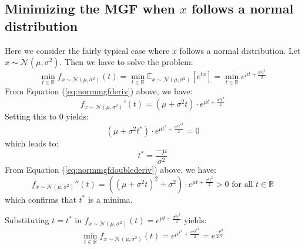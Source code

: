 \documentclass[10pt]{amsart}
\begin{document}
\subsection{Minimizing the MGF when $x$ follows a normal distribution}
Here we consider the fairly typical case where $x$ follows a normal distribution. Let $x\sim \mathcal{N}(\mu, \sigma^2)$. Then we have to solve the problem:
$$\min_{t\in \mathbb{R}} f_{x\sim \mathcal{N}(\mu, \sigma^2)}(t) = \min_{t\in \mathbb{R}} \mathbb{E}_{x\sim \mathcal{N}(\mu, \sigma^2)}[e^{tx}] = \min_{t\in \mathbb{R}} e^{\mu t + \frac {\sigma^2 t^2} 2}$$
From Equation (\ref{eq:normmgfderiv}) above, we have:
$$f_{x\sim \mathcal{N}(\mu, \sigma^2)}'(t) = (\mu + \sigma^2t)\cdot e^{\mu t + \frac {\sigma^2 t^2} 2}$$
Setting this to 0 yields:
$$(\mu + \sigma^2t^*)\cdot e^{\mu t^* + \frac {\sigma^2 {t^*}^2} 2} = 0$$
which leads to:
\begin{equation}
t^* = \frac {-\mu} {\sigma^2}
\end{equation}
From Equation (\ref{eq:normmgfdoublederiv}) above, we have:
$$f_{x\sim \mathcal{N}(\mu, \sigma^2)}''(t) = ((\mu + \sigma^2t)^2 + \sigma^2)\cdot e^{\mu t + \frac {\sigma^2 t^2} 2} > 0 \mbox{ for all } t \in \mathbb{R}$$
which confirms that $t^*$ is a minima.

Substituting $t=t^*$ in $f_{x\sim \mathcal{N}(\mu, \sigma^2)}(t) = e^{\mu t + \frac {\sigma^2 t^2} 2}$ yields:
\begin{equation}
\min_{t\in \mathbb{R}} f_{x\sim \mathcal{N}(\mu, \sigma^2)}(t) = e^{\mu t^* + \frac {\sigma^2 {t^*}^2} 2} = e^{\frac {-\mu^2} {2\sigma^2}}
\end{equation}
\end{document}
